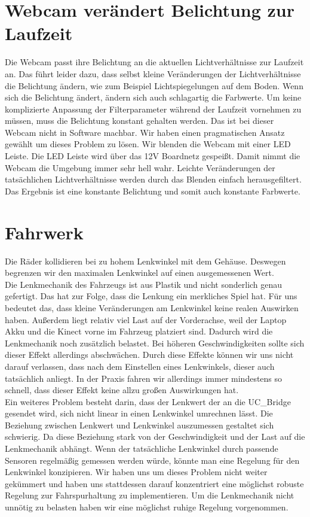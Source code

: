 \section{Webcam verändert Belichtung zur Laufzeit}
\label{sec:belichtung}
Die Webcam passt ihre Belichtung an die aktuellen Lichtverhältnisse zur Laufzeit an.
Das führt leider dazu, dass selbst kleine Veränderungen der Lichtverhältnisse die Belichtung ändern, wie zum Beispiel Lichtspiegelungen auf dem Boden.
Wenn sich die Belichtung ändert, ändern sich auch schlagartig die Farbwerte.
Um keine komplizierte Anpassung der Filterparameter während der Laufzeit vornehmen zu müssen, muss die Belichtung konstant gehalten werden.
Das ist bei dieser Webcam nicht in Software machbar.
Wir haben einen pragmatischen Ansatz gewählt um dieses Problem zu lösen.
Wir blenden die Webcam mit einer LED Leiste.
Die LED Leiste wird über das 12V Boardnetz gespeißt.
Damit nimmt die Webcam die Umgebung immer sehr hell wahr.
Leichte Veränderungen der tatsächlichen Lichtverhältnisse werden durch das Blenden einfach herausgefiltert. 
Das Ergebnis ist eine konstante Belichtung und somit auch konstante Farbwerte.

\section{Fahrwerk}
\label{sec:fahrwerk}
Die Räder kollidieren bei zu hohem Lenkwinkel mit dem Gehäuse.
Deswegen begrenzen wir den maximalen Lenkwinkel auf einen ausgemessenen Wert.
\\
Die Lenkmechanik des Fahrzeugs ist aus Plastik und nicht sonderlich genau gefertigt.
Das hat zur Folge, dass die Lenkung ein merkliches Spiel hat. 
Für uns bedeutet das, dass kleine Veränderungen am Lenkwinkel keine realen Auswirken haben. 
Außerdem liegt relativ viel Last auf der Vorderachse, weil der Laptop Akku und die Kinect vorne im Fahrzeug platziert sind.
Dadurch wird die Lenkmechanik noch zusätzlich belastet.
Bei höheren Geschwindigkeiten sollte sich dieser Effekt allerdings abschwächen. 
Durch diese Effekte können wir uns nicht darauf verlassen, dass nach dem Einstellen eines Lenkwinkels, dieser auch tatsächlich anliegt.
In der Praxis fahren wir allerdings immer mindestens so schnell, dass dieser Effekt keine allzu großen Auswirkungen hat.
\\
Ein weiteres Problem besteht darin, dass der Lenkwert der an die UC_Bridge gesendet wird, sich nicht linear in einen Lenkwinkel umrechnen lässt.
Die Beziehung zwischen Lenkwert und Lenkwinkel auszumessen gestaltet sich schwierig.
Da diese Beziehung stark von der Geschwindigkeit und der Last auf die Lenkmechanik abhängt.
Wenn der tatsächliche Lenkwinkel durch passende Sensoren regelmäßig gemessen werden würde, könnte man eine Regelung für den Lenkwinkel konzipieren.
Wir haben uns um dieses Problem nicht weiter gekümmert und haben uns stattdessen darauf konzentriert eine möglichst robuste Regelung zur Fahrspurhaltung zu implementieren.
Um die Lenkmechanik nicht unnötig zu belasten haben wir eine möglichst ruhige Regelung vorgenommen.





